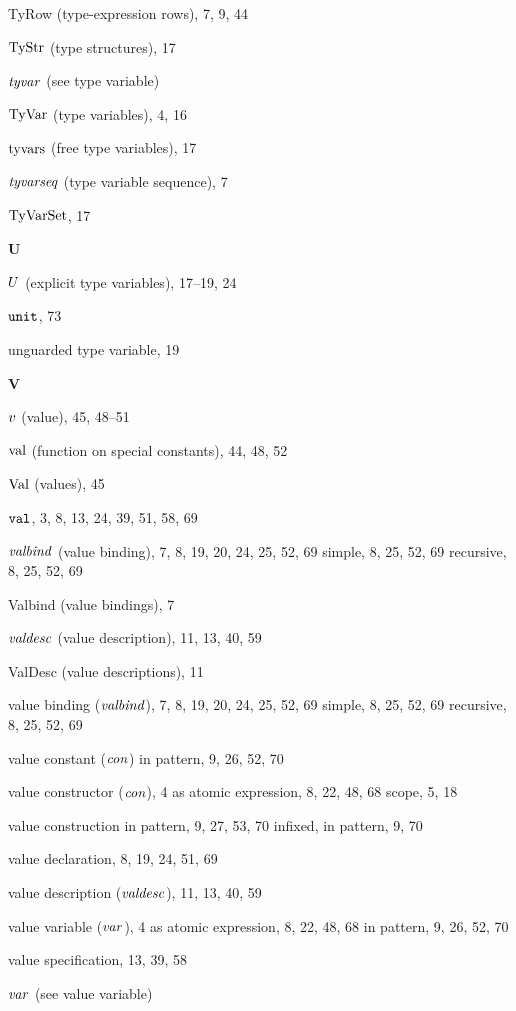 \begin{theindex}
\item TyRow (type-expression rows), 7, 9, 44
\item ${\rm TyStr}$ (type structures), 17
\item ${\it tyvar}$ (see type variable) 
\item ${\rm TyVar}$ (type variables), 4, 16
\item $\mathop{\rm tyvars}\nolimits$ (free type variables), 17
\item ${\it tyvarseq}$ (type variable sequence), 7
\item ${\rm TyVarSet}$, 17
\indexspace
\parbox{65mm}{\hfil{\large\bf U}\hfil}
\indexspace
\item $U$ (explicit type variables), 17--19, 24
\item $\mbox{\tt unit}$, 73
\item unguarded type variable, 19
\indexspace
\parbox{65mm}{\hfil{\large\bf V}\hfil}
\indexspace
\item $v$ (value), 45, 48--51
\item $\mathop{\rm val}\nolimits$ (function on special constants), 44, 48, 52
\item ${\rm Val}$ (values), 45
\item ${\tt val}$, 3, 8, 13, 24, 39, 51, 58, 69
\item ${\it valbind}$ (value binding), 7, 8, 19, 20, 24, 25, 52, 69
\subitem simple, 8, 25, 52, 69
\subitem recursive, 8, 25, 52, 69
\item Valbind (value bindings), 7
\item ${\it valdesc}$ (value description), 11, 13, 40, 59
\item ValDesc (value descriptions), 11
\item value binding (${\it valbind}$), 7, 8, 19, 20, 24, 25, 52, 69
\subitem simple, 8, 25, 52, 69
\subitem recursive, 8, 25, 52, 69
\item value constant (${\it con}$) 
\subitem in pattern, 9, 26, 52, 70
\item value constructor (${\it con}$), 4
\subitem as atomic expression, 8, 22, 48, 68
\subitem scope, 5, 18
\item value construction 
\subitem in pattern, 9, 27, 53, 70
\subitem infixed, in pattern, 9, 70
\item value declaration, 8, 19, 24, 51, 69
\item value description (${\it valdesc}$), 11, 13, 40, 59
\item value variable (${\it var}$), 4
\subitem as atomic expression, 8, 22, 48, 68
\subitem in pattern, 9, 26, 52, 70
\item value specification, 13, 39, 58
\item ${\it var}$ (see value variable) 

\end{theindex}
